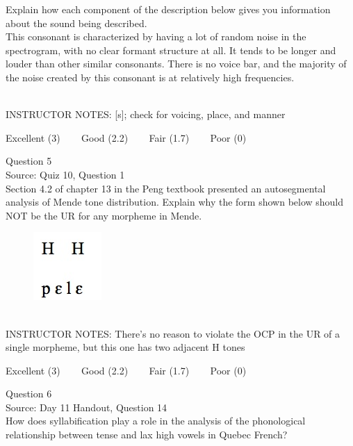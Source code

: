 \documentclass[12pt]{article}
\begin{document}
Explain how each component of the description below gives you information about the sound being described.\\

This consonant is characterized by having a lot of random noise in the spectrogram, with no clear formant structure at all. It tends to be longer and louder than other similar consonants. There is no voice bar, and the majority of the noise created by this consonant is at relatively high frequencies.


~\\
INSTRUCTOR NOTES: [s]; check for voicing, place, and manner


\vfill
Excellent (3) ~~~ Good (2.2) ~~~ Fair (1.7) ~~~ Poor (0)
\newpage

{\large Question 5}\\

Source: Quiz 10, Question 1\\

Section 4.2 of chapter 13 in the Peng textbook presented an autosegmental analysis of Mende tone distribution. Explain why the form shown below should NOT be the UR for any morpheme in Mende.\\

\begin{figure}[H]
\includegraphics{../images/mende_house_b.png}
\end{figure}

~\\
INSTRUCTOR NOTES: There's no reason to violate the OCP in the UR of a single morpheme, but this one has two adjacent H tones


\vfill
Excellent (3) ~~~ Good (2.2) ~~~ Fair (1.7) ~~~ Poor (0)
\newpage

{\large Question 6}\\

Source: Day 11 Handout, Question 14\\

How does syllabification play a role in the analysis of the phonological relationship between tense and lax high vowels in Quebec French?\\
\end{document}
